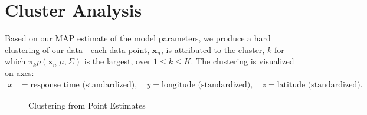 \documentclass{article}
\theoremstyle{theorem}
\theoremstyle{theorem}
\theoremstyle{theorem}
\theoremstyle{lemma}
\theoremstyle{definition}
\theoremstyle{example}
\begin{document}
\section{Cluster Analysis}
Based on our MAP estimate of the model parameters, we produce a hard clustering of our data - each data point, $\mathbf{x}_n$, is attributed to the cluster, $k$ for which $\pi_k p(\mathbf{x}_n | \mu, \Sigma)$ is the largest, over $1\leq k\leq K$. The clustering is visualized on axes: 
\begin{align}
x &= \text{response time (standardized)},\quad y = \text{longitude (standardized)}, \quad z = \text{latitude (standardized)}.
\end{align}

\begin{figure}[h!]
\begin{center}
\caption{Clustering from Point Estimates}
\hskip1cm
\end{center}\label{fig:conv}
\vskip -0.2in
\end{figure} 
\end{document}
